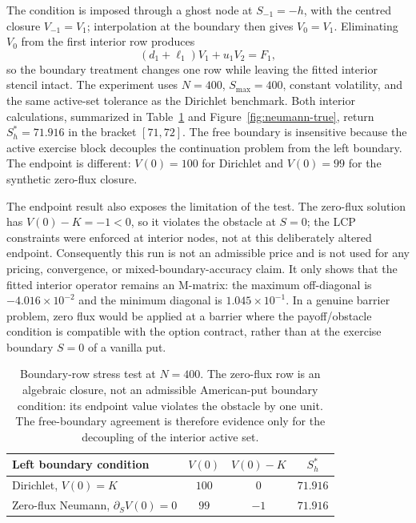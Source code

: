 \documentclass[11pt,a4paper]{article}
\theoremstyle{definition}
\theoremstyle{remark}
\begin{document}
The condition is imposed through a ghost node at \(S_{-1}=-h\), with the
centred closure \(V_{-1}=V_1\); interpolation at the boundary then gives
\(V_0=V_1\). Eliminating \(V_0\) from the first interior row produces
\begin{equation}
    (d_1+\ell_1)V_1+u_1V_2=F_1,
    \label{eq:zero-flux-row}
\end{equation}
so the boundary treatment changes one row while leaving the fitted interior
stencil intact. The experiment uses \(N=400\), \(S_{\max}=400\), constant
volatility, and the same active-set tolerance as the Dirichlet benchmark.
Both interior calculations, summarized in Table~\ref{tab:neumann-free-boundary}
and Figure~\ref{fig:neumann-true}, return \(S_h^*=71.916\) in the bracket
\([71,72]\). The free boundary is insensitive because the active exercise
block decouples the continuation problem from the left boundary. The endpoint
is different: \(V(0)=100\) for Dirichlet and \(V(0)=99\) for the synthetic
zero-flux closure.

The endpoint result also exposes the limitation of the test. The zero-flux
solution has \(V(0)-K=-1<0\), so it violates the obstacle at \(S=0\); the
LCP constraints were enforced at interior nodes, not at this deliberately
altered endpoint. Consequently this run is not an admissible price and is
not used for any pricing, convergence, or mixed-boundary-accuracy claim. It
only shows that the fitted interior operator remains an M-matrix: the maximum
off-diagonal is \(-4.016\times10^{-2}\) and the minimum diagonal is
\(1.045\times10^{-1}\). In a genuine barrier problem, zero flux would be
applied at a barrier where the payoff/obstacle condition is compatible with
the option contract, rather than at the exercise boundary \(S=0\) of a
vanilla put.

\begin{table}[H]
\centering
\begin{tabular}{lccc}
\toprule
\textbf{Left boundary condition} & \textbf{\(V(0)\)} &
\textbf{\(V(0)-K\)} & \textbf{\(S_h^*\)} \\
\midrule
Dirichlet, \(V(0)=K\) & \(100\) & \(0\) & \(71.916\) \\
Zero-flux Neumann, \(\partial_S V(0)=0\) & \(99\) & \(-1\) & \(71.916\) \\
\bottomrule
\end{tabular}
\caption{Boundary-row stress test at \(N=400\). The zero-flux row is an
algebraic closure, not an admissible American-put boundary condition: its
endpoint value violates the obstacle by one unit. The free-boundary agreement
is therefore evidence only for the decoupling of the interior active set.}
\label{tab:neumann-free-boundary}
\end{table}
\end{document}
